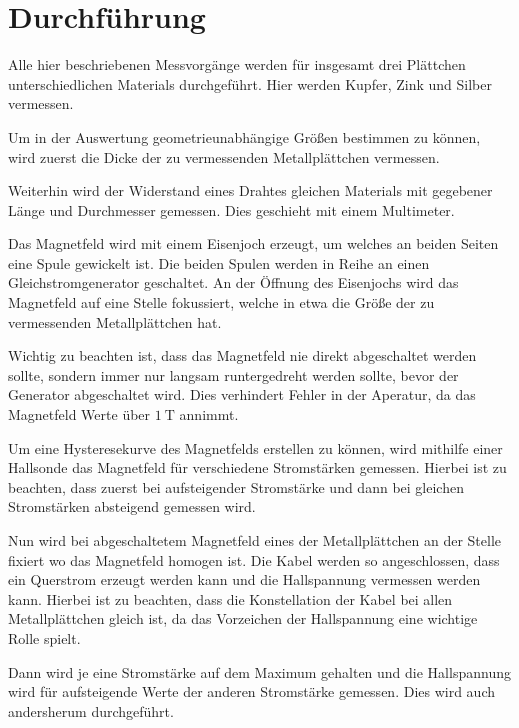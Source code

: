 \section{Durchführung}
\label{sec:Durchführung}


Alle hier beschriebenen Messvorgänge werden für insgesamt drei Plättchen unterschiedlichen Materials durchgeführt. 
Hier werden Kupfer, Zink und Silber vermessen.

Um in der Auswertung geometrieunabhängige Größen bestimmen zu können, wird zuerst die Dicke der zu vermessenden Metallplättchen vermessen.

Weiterhin wird der Widerstand eines Drahtes gleichen Materials mit gegebener Länge und Durchmesser gemessen.
Dies geschieht mit einem Multimeter.

Das Magnetfeld wird mit einem Eisenjoch erzeugt, um welches an beiden Seiten eine Spule gewickelt ist.
Die beiden Spulen werden in Reihe an einen Gleichstromgenerator geschaltet.
An der Öffnung des Eisenjochs wird das Magnetfeld auf eine Stelle fokussiert, welche in etwa die Größe der zu vermessenden Metallplättchen hat.

Wichtig zu beachten ist, dass das Magnetfeld nie direkt abgeschaltet werden sollte, sondern immer nur langsam runtergedreht werden sollte, bevor der Generator abgeschaltet wird. 
Dies verhindert Fehler in der Aperatur, da das Magnetfeld Werte über $\SI{1}{\tesla}$ annimmt.

Um eine Hysteresekurve des Magnetfelds erstellen zu können, wird mithilfe einer Hallsonde das Magnetfeld für verschiedene Stromstärken gemessen.
Hierbei ist zu beachten, dass zuerst bei aufsteigender Stromstärke und dann bei gleichen Stromstärken absteigend gemessen wird.

Nun wird bei abgeschaltetem Magnetfeld eines der Metallplättchen an der Stelle fixiert wo das Magnetfeld homogen ist.
Die Kabel werden so angeschlossen, dass ein Querstrom erzeugt werden kann und die Hallspannung vermessen werden kann. 
Hierbei ist zu beachten, dass die Konstellation der Kabel bei allen Metallplättchen gleich ist, da das Vorzeichen der Hallspannung eine wichtige Rolle spielt.

Dann wird je eine Stromstärke auf dem Maximum gehalten und die Hallspannung wird für aufsteigende Werte der anderen Stromstärke gemessen.
Dies wird auch andersherum durchgeführt.